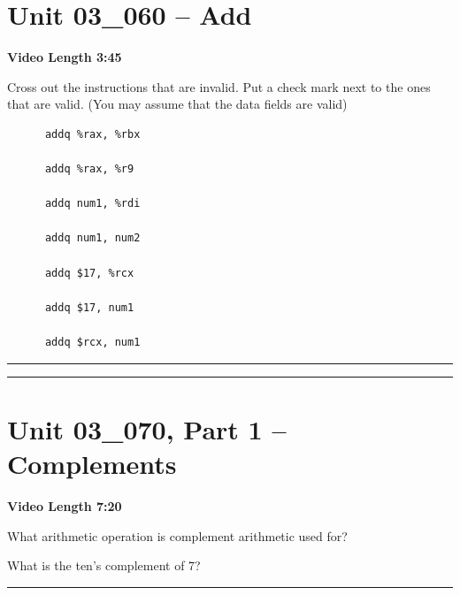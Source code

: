 \documentclass[letterpaper,12pt]{exam}
\newcommand{\unit}{Unit 03}
\begin{document}
\begin{questions}
\section*{\unit\_060 -- Add}
\par{\selectfont\textbf{Video Length 3:45}}
\begin{samepage}
    \question  Cross out the instructions that are invalid.  Put a check mark next to the ones that are valid.  (You may assume that the data fields are valid)
\begin{verbatim}
      addq %rax, %rbx

      addq %rax, %r9
      
      addq num1, %rdi 
      
      addq num1, num2
      
      addq $17, %rcx
      
      addq $17, num1
      
      addq $rcx, num1 
\end{verbatim}
    \vspace{5mm}
\end{samepage}
\par
\rule{0.5\textwidth}{.4pt} %
\rule{0.5\textwidth}{.4pt} %
\section*{\unit\_070, Part 1 -- Complements}
\par{\selectfont\textbf{Video Length 7:20}}
\begin{samepage}
    \question What arithmetic operation is complement arithmetic used for?
    \vspace{5mm}
\end{samepage}
\par
\begin{samepage}
    \question What is the ten's complement of 7?
    \vspace{5mm}
\end{samepage}
\par
\rule{0.5\textwidth}{.4pt} %

\end{questions}
\end{document}
